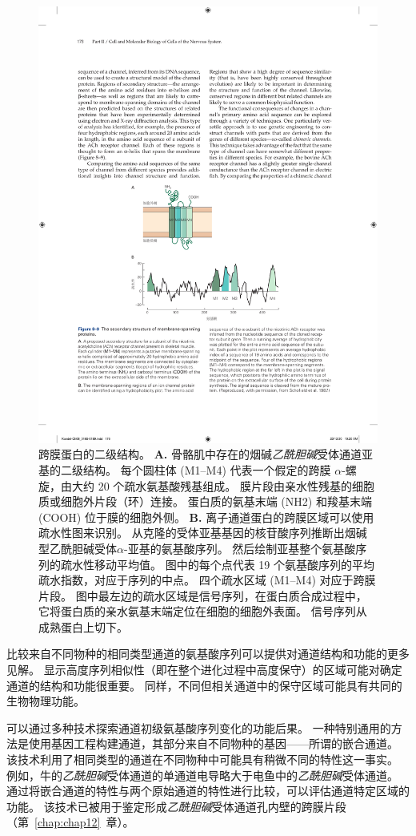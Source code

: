 \begin{figure}[htbp]
	\centering
	\includegraphics[width=0.6\linewidth]{chap08/fig_8_9}
	\caption{跨膜蛋白的二级结构。
		\textbf{A.} 骨骼肌中存在的烟碱\textit{乙酰胆碱}受体通道亚基的二级结构。
		每个圆柱体 (M1–M4) 代表一个假定的跨膜 $\alpha$-螺旋，由大约 20 个疏水氨基酸残基组成。
		膜片段由亲水性残基的细胞质或细胞外片段（环）连接。
		蛋白质的氨基末端 (NH2) 和羧基末端 (COOH) 位于膜的细胞外侧。
		\textbf{B.} 离子通道蛋白的跨膜区域可以使用疏水性图来识别。
		从克隆的受体亚基基因的核苷酸序列推断出烟碱型乙酰胆碱受体$\alpha$-亚基的氨基酸序列。
		然后绘制亚基整个氨基酸序列的疏水性移动平均值。
		图中的每个点代表 19 个氨基酸序列的平均疏水指数，对应于序列的中点。
		四个疏水区域 (M1–M4) 对应于跨膜片段。
		图中最左边的疏水区域是信号序列，在蛋白质合成过程中，它将蛋白质的亲水氨基末端定位在细胞的细胞外表面。
		信号序列从成熟蛋白上切下\cite{schofield1987sequence}。}
	\label{fig:8_9}
\end{figure}


比较来自不同物种的相同类型通道的氨基酸序列可以提供对通道结构和功能的更多见解。
显示高度序列相似性（即在整个进化过程中高度保守）的区域可能对确定通道的结构和功能很重要。
同样，不同但相关通道中的保守区域可能具有共同的生物物理功能。


可以通过多种技术探索通道初级氨基酸序列变化的功能后果。
一种特别通用的方法是使用基因工程构建通道，其部分来自不同物种的基因——所谓的嵌合通道。
该技术利用了相同类型的通道在不同物种中可能具有稍微不同的特性这一事实。
例如，牛的\textit{乙酰胆碱}受体通道的单通道电导略大于电鱼中的\textit{乙酰胆碱}受体通道。
通过将嵌合通道的特性与两个原始通道的特性进行比较，可以评估通道特定区域的功能。
该技术已被用于鉴定形成\textit{乙酰胆碱}受体通道孔内壁的跨膜片段（第~\ref{chap:chap12}~章）。


